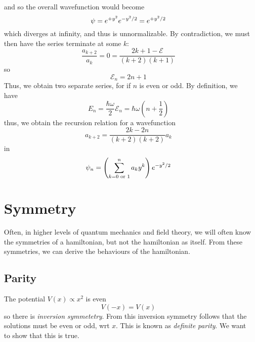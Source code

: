 and so the overall wavefunction would become
\[\psi = e^{+y^2}e^{-y^2/2} = e^{+y^2/2}\]
which diverges at infinity, and thus is unnormalizable. By contradiction, we must then have the series terminate at some \(k\):
\[\frac{a_{k+2}}{a_k} = 0 = \frac{2k+1-\mathcal E}{(k+2)(k+1)}\]
so
\begin{equation}
	\mathcal E_n = 2n +1
\end{equation}
Thus, we obtain two separate series, for if \(n\) is even or odd. By definition, we have
\begin{equation}
	E_n = \frac{\hbar\omega}{2}\mathcal E_n = \hbar\omega \left(n+\frac{1}{2}\right)
\end{equation}
thus, we obtain the recursion relation for a wavefunction
\begin{equation}
	a_{k+2} = \frac{2k-2n}{(k+2)(k+2)}a_k
\end{equation}
in
\begin{equation}
	\psi_n = \left(\sum_{k = 0 \text{\ or } 1}^n a_ky^k\right)e^{-y^2/2}
\end{equation}

\section{Symmetry}
Often, in higher levels of quantum mechanics and field theory, we will often know the symmetries of a hamiltonian, but not the hamiltonian as itself. From these symmetries, we can derive the behaviours of the hamiltonian.

\subsection{Parity}
The potential \(V(x)\propto x^2\) is even
\begin{equation}
	V(-x)=V(x)
\end{equation}
so there is \emph{inversion symmetetry}. From this inversion symmetry follows that the solutions must be even or odd, wrt \(x\). This is known as \emph{definite parity}. We want to show that this is true.


